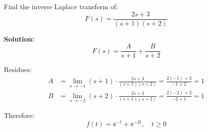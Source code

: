 \begin{examplebox}[title=Example 0.3: Partial Fraction Expansion with Distinct Real Poles]
Find the inverse Laplace transform of:
\begin{equation}
F(s) = \frac{2s + 3}{(s+1)(s+2)}
\end{equation}

\textbf{Solution:}
\begin{equation}
F(s) = \frac{A}{s+1} + \frac{B}{s+2}
\end{equation}

Residues:
\begin{align}
A &= \lim_{s \to -1} (s+1) \cdot \frac{2s+3}{(s+1)(s+2)} = \frac{2(-1)+3}{-1+2} = 1 \\
B &= \lim_{s \to -2} (s+2) \cdot \frac{2s+3}{(s+1)(s+2)} = \frac{2(-2)+3}{-2+1} = 1
\end{align}

Therefore:
\begin{equation}
f(t) = \ee^{-t} + \ee^{-2t}, \quad t \geq 0
\end{equation}
\end{examplebox}

